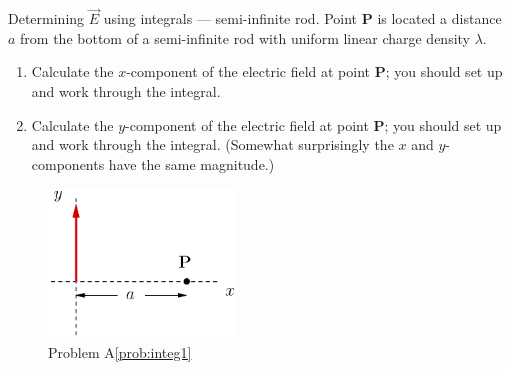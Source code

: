 \begin{aproblem}{Determining $\vec{E}$ using integrals --- semi-infinite rod.} 
  Point {\bf P} is located a distance $a$ from the bottom of a
  semi-infinite rod with uniform linear charge density $\lambda$.
    \begin{enumerate}
    \item Calculate the $x$-component of the electric field at point
      {\bf P}; you should set up and work through the integral.
    \item Calculate the $y$-component of the electric field at point
      {\bf P}; you should set up and work through the integral.
      (Somewhat surprisingly the $x$ and $y$-components have the same
      magnitude.)
    \end{enumerate}
    \label{prob:integ1}

    \begin{figure}[h]
      \begin{center}
        \includegraphics[width=5cm]{additional_problems/integ1}
        \caption{Problem A\ref{prob:integ1}}
      \end{center}
    \end{figure}
\end{aproblem}


